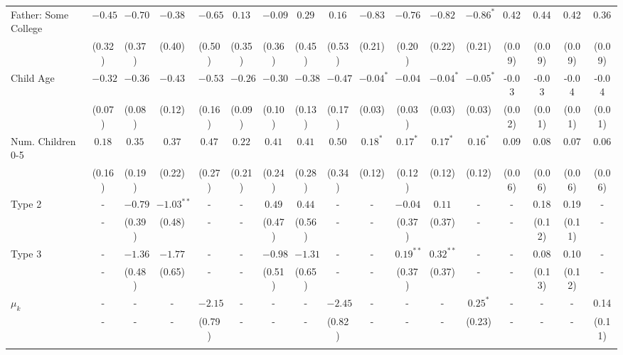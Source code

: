 \begin{tabular}{lcccccccccccccccc}
Father: Some College&$-0.45$&$-0.70$&$-0.38$&$-0.65$&$0.13$&$-0.09$&$0.29$&$0.16$&$-0.83$&$-0.76$&$-0.82$&$-0.86^{*}$&0.42&0.44&0.42&0.36\\
&(0.32)&(0.37)&(0.40)&(0.50)&(0.35)&(0.36)&(0.45)&(0.53)&(0.21)&(0.20)&(0.22)&(0.21)&(0.09)&(0.09)&(0.09)&(0.09)\\
Child Age&$-0.32$&$-0.36$&$-0.43$&$-0.53$&$-0.26$&$-0.30$&$-0.38$&$-0.47$&$-0.04^{*}$&$-0.04$&$-0.04^{*}$&$-0.05^{*}$&-0.03&-0.03&-0.04&-0.04\\
&(0.07)&(0.08)&(0.12)&(0.16)&(0.09)&(0.10)&(0.13)&(0.17)&(0.03)&(0.03)&(0.03)&(0.03)&(0.02)&(0.01)&(0.01)&(0.01)\\
Num. Children 0-5&$0.18$&$0.35$&$0.37$&$0.47$&$0.22$&$0.41$&$0.41$&$0.50$&$0.18^{*}$&$0.17^{*}$&$0.17^{*}$&$0.16^{*}$&0.09&0.08&0.07&0.06\\
&(0.16)&(0.19)&(0.22)&(0.27)&(0.21)&(0.24)&(0.28)&(0.34)&(0.12)&(0.12)&(0.12)&(0.12)&(0.06)&(0.06)&(0.06)&(0.06)\\
Type 2&-&$-0.79$&$-1.03^{**}$&-&-&$0.49$&$0.44$&-&-&$-0.04$&$0.11$&-&-&0.18&0.19&-\\
&-&(0.39)&(0.48)&-&-&(0.47)&(0.56)&-&-&(0.37)&(0.37)&-&-&(0.12)&(0.11)&-\\
Type 3&-&$-1.36$&$-1.77$&-&-&$-0.98$&$-1.31$&-&-&$0.19^{**}$&$0.32^{**}$&-&-&0.08&0.10&-\\
&-&(0.48)&(0.65)&-&-&(0.51)&(0.65)&-&-&(0.37)&(0.37)&-&-&(0.13)&(0.12)&-\\
$\mu_{k}$&-&-&-&$-2.15$&-&-&-&$-2.45$&-&-&-&$0.25^{*}$&-&-&-&0.14\\
&-&-&-&(0.79)&-&-&-&(0.82)&-&-&-&(0.23)&-&-&-&(0.11)\\
\\
\bottomrule\end{tabular}